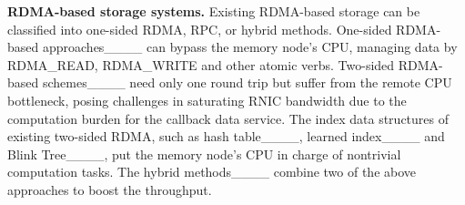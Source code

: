 \textbf{RDMA-based storage systems.} 
Existing RDMA-based storage can be classified into one-sided RDMA, RPC, or hybrid methods.
One-sided RDMA-based approaches____ can bypass the memory node's CPU, managing data by RDMA\_READ, RDMA\_WRITE and other atomic verbs. 
Two-sided RDMA-based schemes____ need only one round trip but suffer from the remote CPU bottleneck, posing challenges in saturating RNIC bandwidth due to the computation burden for the callback data service. The index data structures of existing two-sided RDMA, such as hash table____, learned index____ and Blink Tree____, put the memory node's CPU in charge of nontrivial computation tasks. 
The hybrid methods____ combine two of the above approaches to boost the throughput. 


